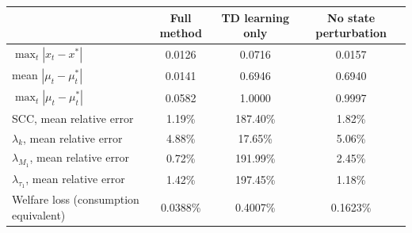 \begin{tabular}{lccc}
\toprule
 & Full method & TD learning only & No state perturbation \\
\midrule
$\max_t |x_t - x^*|$ & 0.0126 & 0.0716 & 0.0157 \\
mean $|\mu_t - \mu_t^*|$ & 0.0141 & 0.6946 & 0.6940 \\
$\max_t |\mu_t - \mu_t^*|$ & 0.0582 & 1.0000 & 0.9997 \\
SCC, mean relative error & 1.19\% & 187.40\% & 1.82\% \\
$\lambda_k$, mean relative error & 4.88\% & 17.65\% & 5.06\% \\
$\lambda_{M_1}$, mean relative error & 0.72\% & 191.99\% & 2.45\% \\
$\lambda_{\tau_1}$, mean relative error & 1.42\% & 197.45\% & 1.18\% \\
Welfare loss (consumption equivalent) & 0.0388\% & 0.4007\% & 0.1623\% \\
\bottomrule
\end{tabular}
